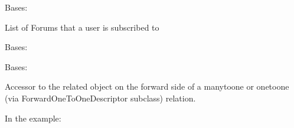 \documentclass[letterpaper,10pt,english]{sphinxmanual}
\begin{document}
\begin{fulllineitems}
\label{\detokenize{forums:forums.models.ForumFollow}}
Bases: 

List of Forums that a user is subscribed to

\begin{fulllineitems}
\label{\detokenize{forums:forums.models.ForumFollow.DoesNotExist}}
Bases: 

\end{fulllineitems}


\begin{fulllineitems}
\label{\detokenize{forums:forums.models.ForumFollow.MultipleObjectsReturned}}
Bases: 

\end{fulllineitems}


\begin{fulllineitems}
\label{\detokenize{forums:forums.models.ForumFollow.forum}}
Accessor to the related object on the forward side of a many\sphinxhyphen{}to\sphinxhyphen{}one or
one\sphinxhyphen{}to\sphinxhyphen{}one (via ForwardOneToOneDescriptor subclass) relation.

In the example:

\begin{sphinxVerbatim}[commandchars=\\\{\}]
 
       
\end{sphinxVerbatim}


\end{fulllineitems}
\end{fulllineitems}
\end{document}

